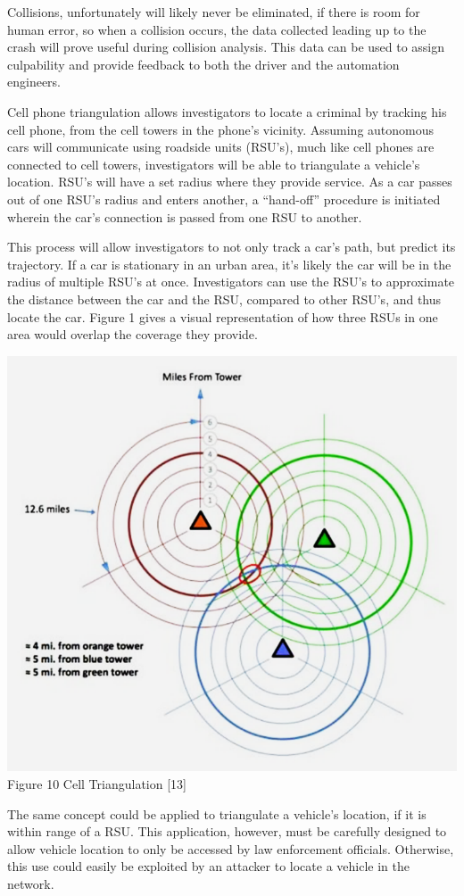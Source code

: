 \documentclass[conference,compsoc]{IEEEtran}
\begin{document}
Collisions, unfortunately will likely never be eliminated, if there is room for human error, so when a collision occurs, the data collected leading up to the crash will prove useful during collision analysis. This data can be used to assign culpability and provide feedback to both the driver and the automation engineers. 

Cell phone triangulation allows investigators to locate a criminal by tracking his cell phone, from the cell towers in the phone’s vicinity. Assuming autonomous cars will communicate using roadside units (RSU’s), much like cell phones are connected to cell towers, investigators will be able to triangulate a vehicle’s location. RSU’s will have a set radius where they provide service. As a car passes out of one RSU’s radius and enters another, a “hand-off” procedure is initiated wherein the car’s connection is passed from one RSU to another. 

This process will allow investigators to not only track a car’s path, but predict its trajectory. If a car is stationary in an urban area, it’s likely the car will be in the radius of multiple RSU’s at once. Investigators can use the RSU’s to approximate the distance between the car and the RSU, compared to other RSU’s, and thus locate the car. Figure 1 gives a visual representation of how three RSUs in one area would overlap the coverage they provide.\\
\begin{center}
\includegraphics[scale = .98]{cell.png}
\small{Figure 10 Cell Triangulation [13]}
\break
\end{center}
The same concept could be applied to triangulate a vehicle’s location, if it is within range of a RSU. This application, however, must be carefully designed to allow vehicle location to only be accessed by law enforcement officials. Otherwise, this use could easily be exploited by an attacker to locate a vehicle in the network. 
\end{document}
